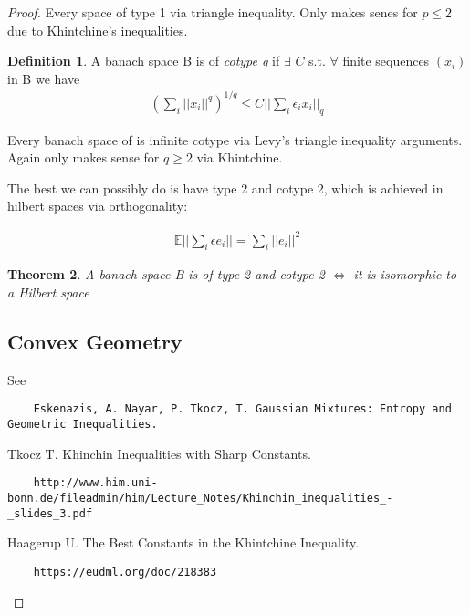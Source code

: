 \documentclass[10pt]{article}
\newcommand{\E}{\mathbb{E}}
\newcommand{\1}{\textbf{1}}
\newcommand{\norm}[1]{||#1||}
\newtheorem{theorem}{Theorem}
\theoremstyle{remark}
\theoremstyle{definition}
\newtheorem{defn}[theorem]{Definition}
\begin{document}
\begin{proof}

Every space of type 1 via triangle inequality. Only makes senes for $p \leq 2$ due to Khintchine's inequalities.%

\begin{defn}
	A banach space B is of \textit{cotype q} if $\exists$ $C$ s.t. $\forall$ finite sequences $(x_i)$ in B we have
	\begin{align*}
		(\sum_i \norm{x_i}^q)^{1/q} \leq C \norm{\sum_i \epsilon_i x_i}_q
	\end{align*}
\end{defn}

Every banach space of is infinite cotype via Levy's triangle inequality arguments. Again only makes sense for $q \geq 2$ via Khintchine.

The best we can possibly do is have type 2 and cotype 2, which is achieved in hilbert spaces via orthogonality:

\begin{align*}
	\E \norm{\sum_i \epsilon e_i} = \sum_i\norm{e_i}^2
\end{align*}

\begin{theorem}
	A banach space B is of type 2 and cotype 2 $\iff$ it is isomorphic to a Hilbert space
\end{theorem}

\subsection{Convex Geometry}

See

\begin{verbatim}
	Eskenazis, A. Nayar, P. Tkocz, T. Gaussian Mixtures: Entropy and Geometric Inequalities.
\end{verbatim}



\begin{thebibliography}{9}

 Tkocz T. Khinchin Inequalities with Sharp Constants. 

\begin{verbatim}
	http://www.him.uni-bonn.de/fileadmin/him/Lecture_Notes/Khinchin_inequalities_-_slides_3.pdf
\end{verbatim}

 Haagerup U. The Best Constants in the Khintchine Inequality. 

\begin{verbatim}
	https://eudml.org/doc/218383
\end{verbatim}


\end{thebibliography}
\end{proof}
\end{document}

